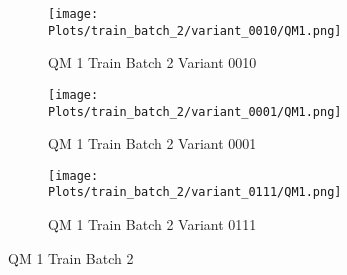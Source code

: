 \documentclass{DissertateFigs}
\begin{document}
\begin{figure}[t!]
\medskip

    \begin{subfigure}{0.47\textwidth}
    \texttt{[image: Plots/train\_batch\_2/variant\_0010/QM1.png]}
    \caption{QM 1 Train Batch 2 Variant 0010}
    \end{subfigure}
    \begin{subfigure}{0.47\textwidth}
    \texttt{[image: Plots/train\_batch\_2/variant\_0001/QM1.png]}
    \caption{QM 1 Train Batch 2 Variant 0001}
    \end{subfigure}

\medskip

    \begin{subfigure}{0.47\textwidth}
    \texttt{[image: Plots/train\_batch\_2/variant\_0111/QM1.png]}
    \caption{QM 1 Train Batch 2 Variant 0111}
    \end{subfigure}
\caption{QM 1 Train Batch 2}
    \end{figure}
\clearpage
\end{document}
